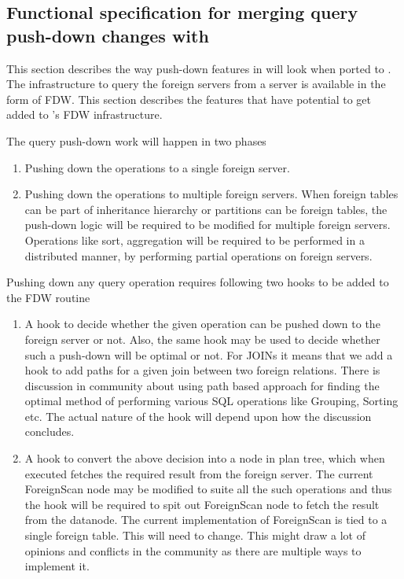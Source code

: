 \subsection{Functional specification for merging query push-down changes with \PG}

	This section describes the way push-down features in \XC{} will look when ported to \PG.
	The infrastructure to query the foreign servers from a \PG{} server is available in
	the form of FDW.
	This section describes the features that have potential to get added to
	\PG's FDW infrastructure.

	The query push-down work will happen in two phases

	\begin{enumerate}
		\item Pushing down the operations to a single foreign server.
		\item Pushing down the operations to multiple foreign servers.
			  When foreign tables can be part of inheritance hierarchy or partitions
			  can be foreign tables, the push-down logic will be required to be modified
			  for multiple foreign servers.
			  Operations like sort, aggregation will be required to be performed in
			  a distributed manner, by performing partial operations on foreign servers.
	\end{enumerate}

	Pushing down any query operation requires following two hooks to be added to the FDW routine

	\begin{enumerate}
		\item A hook to decide whether the given operation can be pushed down to the foreign
			  server or not.
			  Also, the same hook may be used to decide whether such a push-down will be
			  optimal or not.
			  For JOINs it means that we add a hook to add paths for a given join between
			  two foreign relations.
			  There is discussion in community about using path based approach for finding
			  the optimal method of performing various SQL operations like Grouping, Sorting etc.
			  The actual nature of the hook will depend upon how the discussion concludes.
		\item A hook to convert the above decision into a node in plan tree, which when
			  executed fetches the required result from the foreign server.
			  The current ForeignScan node may be modified to suite all the such
			  operations and thus the hook will be required to spit out ForeignScan
			  node to fetch the result from the datanode.
			  The current implementation of ForeignScan is tied to a single foreign table.
			  This will need to change. This might draw a lot of opinions and conflicts
			  in the community as there are multiple ways to implement it.
	\end{enumerate}

